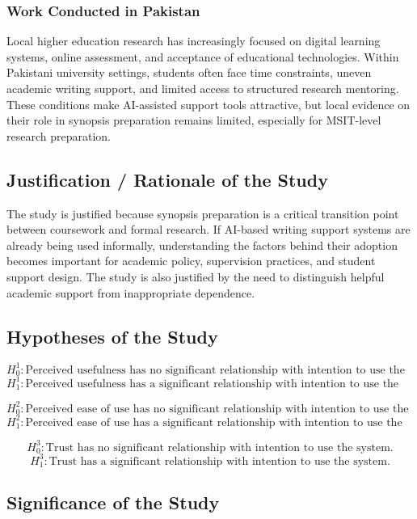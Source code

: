 \documentclass[11pt,a4paper]{article}
\begin{document}
\subsubsection{Work Conducted in Pakistan}

Local higher education research has increasingly focused on digital learning systems, online assessment, and acceptance of educational technologies. Within Pakistani university settings, students often face time constraints, uneven academic writing support, and limited access to structured research mentoring. These conditions make AI-assisted support tools attractive, but local evidence on their role in synopsis preparation remains limited, especially for MSIT-level research preparation.

\subsection{Justification / Rationale of the Study}

The study is justified because synopsis preparation is a critical transition point between coursework and formal research. If AI-based writing support systems are already being used informally, understanding the factors behind their adoption becomes important for academic policy, supervision practices, and student support design. The study is also justified by the need to distinguish helpful academic support from inappropriate dependence.

\subsection{Hypotheses of the Study}

\[H_0^1: \text{Perceived usefulness has no significant relationship with intention to use the system.}\]
\[H_1^1: \text{Perceived usefulness has a significant relationship with intention to use the system.}\]

\[H_0^2: \text{Perceived ease of use has no significant relationship with intention to use the system.}\]
\[H_1^2: \text{Perceived ease of use has a significant relationship with intention to use the system.}\]

\[H_0^3: \text{Trust has no significant relationship with intention to use the system.}\]
\[H_1^3: \text{Trust has a significant relationship with intention to use the system.}\]

\subsection{Significance of the Study}
\end{document}
